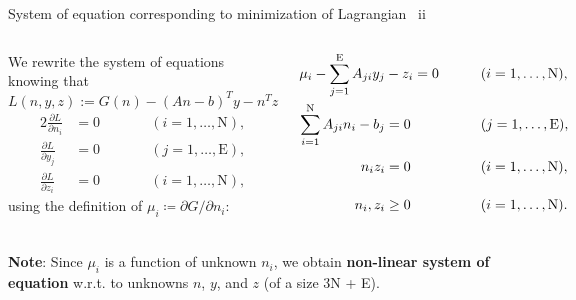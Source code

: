 \begin{frame}{System of equation corresponding to minimization of Lagrangian \, ii}

\small
\begin{columns}[c]
%
%
We rewrite the system of equations knowing that $L(n,y,z):=G(n)-(An-b)^{T}y-n^{T}z$\\[1pt]
%
\begin{alignat*}{2}
\frac{\partial L}{\partial n_{i}} & =0 & \qquad & (i=1,\ldots,\text{N}),\\[10pt]
\frac{\partial L}{\partial y_{j}} & =0 & \qquad & (j=1,\ldots,\text{E}),\\[10pt]
\frac{\partial L}{\partial z_{i}} & =0 & \qquad & (i=1,\ldots,\text{N}),
\end{alignat*}
%
\vskip 10pt
using the definition of $\mu_{i}\coloneqq\partial G/\partial n_{i}$: 
\pause
\begin{overprint}
\vskip 10pt
\begin{alignat*}{2}
\mu_{i}-\sum_{j=1}^{\text{E}}A_{ji}y_{j} & -z_{i}=0 & \qquad\vphantom{\frac{\partial L}{\partial y_{j}}} & (i=1,\ldots,\text{N}),\\
\sum_{i=1}^{\text{N}}A_{ji}n_{i}-b_{j} & =0 & \vphantom{\frac{\partial L}{\partial y_{j}}} & (j=1,\ldots,\text{E}),\\
n_{i}z_{i} & =0 & \vphantom{\frac{\partial L}{\partial y_{j}}} & (i=1,\ldots,\text{N}),\\
n_{i},z_{i} & \geq0 & \vphantom{\frac{\partial L}{\partial y_{j}}} & (i=1,\ldots,\text{N}).
\end{alignat*}
\end{overprint}
\end{columns}
\pause
\vskip 10pt
\alert{\bf Note}: Since $\mu_{i}$ is a function of unknown $n_{i}$, we obtain {\bf non-linear system of equation} w.r.t. to unknowns
$n$, $y$, and $z$ (of a size 3N + E).

\end{frame}

